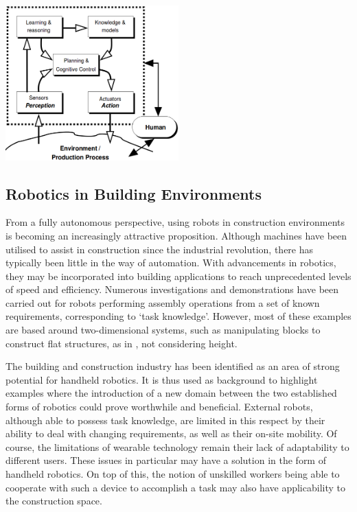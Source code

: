\documentclass[11pt]{article}
\begin{document}
\begin{center}
\includegraphics[width = 0.5\textwidth]{cognitivearchitecture.png}
\label{figure:cognitivearchitecture}
\end{center}

\pagebreak

\subsection{Robotics in Building Environments} \label{building}

From a fully autonomous perspective, using robots in construction environments is becoming an increasingly attractive proposition. Although machines have been utilised to assist in construction since the industrial revolution, there has typically been little in the way of automation. With advancements in robotics, they may be incorporated into building applications to reach unprecedented levels of speed and efficiency. Numerous investigations and demonstrations have been carried out for robots performing assembly operations from a set of known requirements, corresponding to `task knowledge'. However, most of these examples are based around two-dimensional systems, such as manipulating blocks to construct flat structures, as in \cite{werfel2006}, not considering height.

The building and construction industry has been identified as an area of strong potential for handheld robotics. It is thus used as background to highlight examples where the introduction of a new domain between the two established forms of robotics could prove worthwhile and beneficial. External robots, although able to possess task knowledge, are limited in this respect by their ability to deal with changing requirements, as well as their on-site mobility. Of course, the limitations of wearable technology remain their lack of adaptability to different users. These issues in particular may have a solution in the form of handheld robotics. On top of this, the notion of unskilled workers being able to cooperate with such a device to accomplish a task may also have applicability to the construction space.
\end{document}
